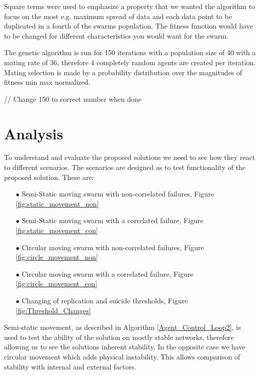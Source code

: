 \documentclass{UoYCSproject}
\begin{document}
Square terms were used to emphasize a property that we wanted the algorithm to focus on the most e.g. maximum spread of data and each data point to be duplicated in a fourth of the swarms population. The fitness function would have to be changed for different characteristics you would want for the swarm.

The genetic algorithm is run for 150 iterations with a population size of 40 with a mating rate of 36, therefore 4 completely random agents are created per iteration. Mating selection is made by a probability distribution over the magnitudes of fitness min max normalized.

// Change 150 to correct number when done




\chapter{Analysis}
\label{cha:Analysis}

To understand and evaluate the proposed solutions we need to see how they react to different scenarios. 
The scenarios are designed as to test functionality of the proposed solution. 
These are:

\begin{itemize}
\itemsep-1em
\item[$\bullet$] Semi-Static moving swarm with non-correlated failures, Figure \ref{fig:static_movement_non}
\item[$\bullet$] Semi-Static moving swarm with a correlated failure, Figure \ref{fig:static_movement_con}
\item[$\bullet$] Circular moving swarm with non-correlated failures, Figure \ref{fig:circle_movement_non}
\item[$\bullet$] Circular moving swarm with a correlated failure, Figure \ref{fig:circle_movement_con}
\item[$\bullet$] Changing of replication and suicide thresholds, Figure \ref{fig:Threshold_Changes}
\end{itemize}

Semi-static movement, as described in Algorithm \ref{Agent_Control_Loop2}, is used to test the ability of the solution on mostly stable networks, therefore allowing us to see the solutions inherent stability. 
In the opposite case we have circular movement which adds physical instability. 
This allows comparison of stability with internal and external factors.
\end{document}
